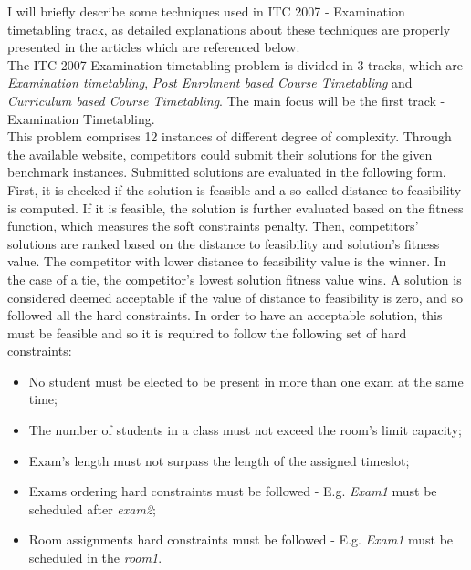 I will briefly describe some techniques used in ITC 2007 - Examination timetabling track, as detailed explanations about these techniques are properly presented in the articles which are referenced below.
\\
The ITC 2007 Examination timetabling problem is divided in 3 tracks, which are \textit{Examination timetabling}, \textit{Post Enrolment based Course Timetabling} and \textit{Curriculum based Course Timetabling}. The main focus will be the first track - Examination Timetabling.
\\
This problem comprises 12 instances of different degree of complexity. Through the available website, competitors could submit  their solutions for the given benchmark instances. Submitted solutions are evaluated in the following form. First, it is checked if the solution is feasible and a so-called distance to feasibility is computed. If it is feasible, the solution is further evaluated based on the fitness function, which measures the soft constraints penalty. Then, competitors' solutions are ranked based on the distance to feasibility and solution's fitness value. The competitor with lower distance to feasibility value is the winner. In the case of a tie, the competitor's lowest solution fitness value wins. A solution is considered deemed acceptable if the value of distance to feasibility is zero, and so followed all the hard constraints. In order to have an acceptable solution, this must be feasible and so it is required to follow the following set of hard constraints:
\begin{itemize}
	\item No student must be elected to be present in more than one exam at the same time;
	\item The number of students in a class must not exceed the room's limit capacity;
	\item Exam's length must not surpass the length of the assigned timeslot;
	\item Exams ordering hard constraints must be followed - E.g. \textit {Exam1} must be scheduled after \textit{exam2};
	\item Room assignments hard constraints must be followed - E.g. 	\textit{Exam1} must be scheduled in the \textit{room1}.
\end{itemize}

